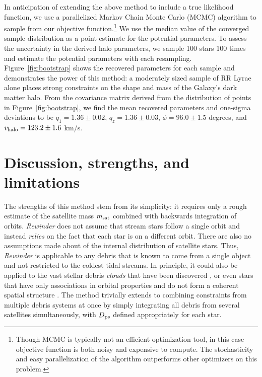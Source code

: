 In anticipation of extending the above method to include a true
likelihood function, we use a parallelized Markov Chain Monte Carlo
(MCMC) algorithm \citep{foremanmackey2013} to sample from our
objective function.\footnote{Though MCMC is typically not an efficient
  optimization tool, in this case objective function is both noisy and
  expensive to compute. The stochasticity and easy parallelization of
  the algorithm outperforms other optimizers on this problem.}
We use the median value of the converged sample distribution as a
point estimate for the potential parameters. To assess the uncertainty
in the derived halo parameters, we sample 100 stars
100 times and estimate the potential parameters with each
resampling. Figure~\ref{fig:bootstrap} shows the recovered parameters
for each sample and demonstrates the power of this method:
a moderately sized sample of RR Lyrae
alone places strong constraints on the shape and mass of the
Galaxy's dark matter halo. From the covariance matrix derived from the 
distribution of points in Figure~\ref{fig:bootstrap}, we find the mean 
recovered parameters and one-sigma deviations to be 
$q_1 = 1.36 \pm 0.02$, $q_z = 1.36 \pm 0.03$, $\phi = 96.0 \pm 1.5$ degrees,
and $v_{\rm halo} = 123.2 \pm 1.6$ km/s.

\section{Discussion, strengths, and limitations}
\label{sec:discussion}

The strengths of this method stem from its simplicity: it requires
only a rough estimate of the satellite mass $m_{\rm sat}$ combined
with backwards integration of orbits. 
\emph{Rewinder} does not assume that stream stars follow
a single orbit and instead \emph{relies}
on the fact that each star is on a different orbit. There are also no assumptions made
about of the internal distribution of satellite
stars. Thus, \emph{Rewinder} is applicable to any debris that is
known to come from a single object and not restricted to the coldest
tidal streams. In principle, it could also be applied to the
vast stellar debris {\it clouds} that have been discovered 
\citep[e.g., the Triangulum-Andromeda and Hercules-Aquila
  clouds;][]{rochapinto04,belokurov06}, or even stars that have only
associations in orbital properties and do not form a coherent spatial
structure \citep[e.g.][]{helmi99}. The method trivially extends to
combining constraints from multiple debris systems at once by simply
integrating all debris from several satellites simultaneously, with
$D_{\rm ps}$ defined appropriately for each star.

